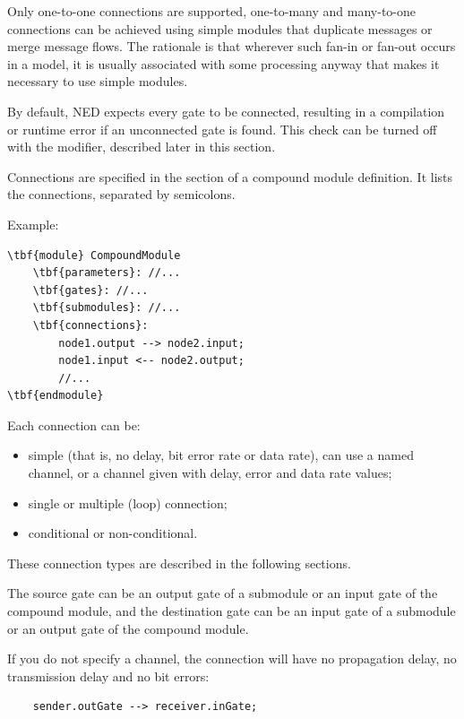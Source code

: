 Only one-to-one connections are supported, one-to-many and many-to-one
connections can be achieved using simple modules that duplicate
messages or merge message flows. The rationale is that wherever
such fan-in or fan-out occurs in a model, it is usually associated
with some processing anyway that makes it necessary to use
simple modules.


By default, NED expects every gate to be connected, resulting in
a compilation or runtime error if an unconnected gate is found.
This check can be turned off with the  modifier,
described later in this section.

Connections are specified in the
 section of a compound
module definition. It lists the connections, separated by semicolons.

Example:

\begin{Verbatim}[commandchars=\\\{\}]
\tbf{module} CompoundModule
    \tbf{parameters}: //...
    \tbf{gates}: //...
    \tbf{submodules}: //...
    \tbf{connections}:
        node1.output --> node2.input;
        node1.input <-- node2.output;
        //...
\tbf{endmodule}
\end{Verbatim}


Each connection can be:
\begin{itemize}
  \item{simple (that is, no delay, bit error rate or data rate), can
    use a named channel, or a channel given with delay, error and
    data rate values;}
\item{single or multiple (loop) connection;}
\item{conditional or non-conditional.}
\end{itemize}

These connection types are described in the following sections.




The source gate can be an output gate of a submodule or an input
gate of the compound module, and the destination gate can be
an input gate of a submodule or an output gate of the compound
module.


If you do not specify a channel, the connection will have
no propagation delay, no transmission delay and no bit errors:
\begin{verbatim}
    sender.outGate --> receiver.inGate;
\end{verbatim}

